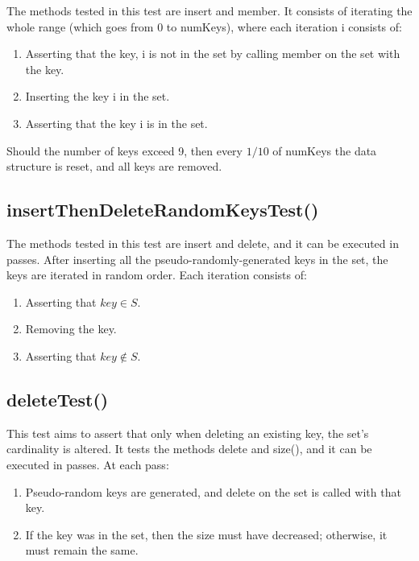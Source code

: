 The methods tested in this test are {\ttfamily insert} and {\ttfamily member}. It consists of iterating the whole range (which goes from $0$ to {\ttfamily numKeys}), where each iteration {\ttfamily i} consists of:
\begin{enumerate}
    \item
    Asserting that the key, {\ttfamily i} is not in the set by calling {\ttfamily member} on the set with the key.
    \item
    Inserting the key {\ttfamily i} in the set.
    \item
    Asserting that the key {\ttfamily i} is in the set.
\end{enumerate}
Should the number of keys exceed 9, then every $1/10$ of {\ttfamily numKeys} the data structure is reset, and all keys are removed.

\subsection{{\ttfamily insertThenDeleteRandomKeysTest()}}

The methods tested in this test are {\ttfamily insert} and {\ttfamily delete}, and it can be executed in passes. After inserting all the pseudo-randomly-generated keys in the set, the keys are iterated in random order. Each iteration consists of:
\begin{enumerate}
    \item
    Asserting that $key \in S$.
    \item
    Removing the key.
    \item
    Asserting that $key \not\in S$.
\end{enumerate}

\subsection{{\ttfamily deleteTest()}}

This test aims to assert that only when deleting an existing key, the set's cardinality is altered. It tests the methods {\ttfamily delete} and {\ttfamily size()}, and it can be executed in passes. At each pass:
\begin{enumerate}
    \item
    Pseudo-random keys are generated, and delete on the set is called with that key.
    \item
    If the key was in the set, then the size must have decreased; otherwise, it must remain the same.
\end{enumerate}

